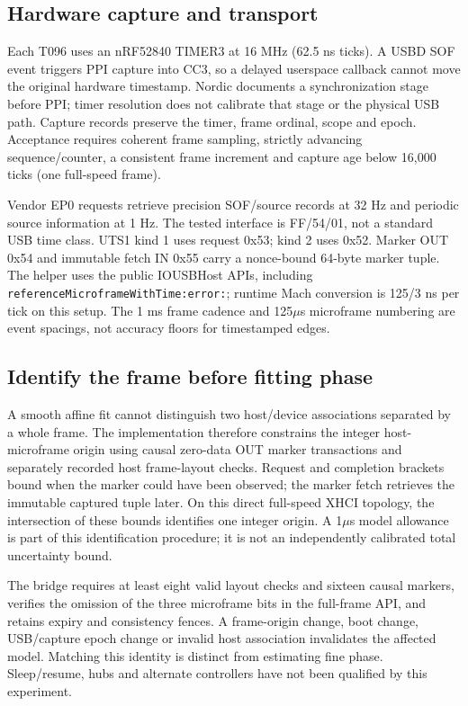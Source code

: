 \documentclass[11pt,letterpaper]{article}
\newcommand{\code}[1]{\texttt{#1}}\newcolumntype{L}[1]{>{\RaggedRight\arraybackslash}p{#1}}
\begin{document}
\subsection{Hardware capture and transport}
Each T096 uses an nRF52840 TIMER3 at 16 MHz (62.5 ns ticks). A USBD SOF event triggers PPI capture into CC3, so a delayed userspace callback cannot move the original hardware timestamp. Nordic documents a synchronization stage before PPI; timer resolution does not calibrate that stage or the physical USB path\cite{nordic}. Capture records preserve the timer, frame ordinal, scope and epoch. Acceptance requires coherent frame sampling, strictly advancing sequence/counter, a consistent frame increment and capture age below 16,000 ticks (one full-speed frame).

Vendor EP0 requests retrieve precision SOF/source records at 32 Hz and periodic source information at 1 Hz. The tested interface is FF/54/01, not a standard USB time class. UTS1 kind 1 uses request 0x53; kind 2 uses 0x52. Marker OUT 0x54 and immutable fetch IN 0x55 carry a nonce-bound 64-byte marker tuple. The helper uses the public IOUSBHost APIs, including \code{referenceMicroframeWithTime:error:}; runtime Mach conversion is 125/3 ns per tick on this setup\cite{appleusb,appleframe}. The 1 ms frame cadence and 125$\mu$s microframe numbering are event spacings, not accuracy floors for timestamped edges.

\subsection{Identify the frame before fitting phase}
A smooth affine fit cannot distinguish two host/device associations separated by a whole frame. The implementation therefore constrains the integer host-microframe origin using causal zero-data OUT marker transactions and separately recorded host frame-layout checks. Request and completion brackets bound when the marker could have been observed; the marker fetch retrieves the immutable captured tuple later. On this direct full-speed XHCI topology, the intersection of these bounds identifies one integer origin. A 1$\mu$s model allowance is part of this identification procedure; it is not an independently calibrated total uncertainty bound.

The bridge requires at least eight valid layout checks and sixteen causal markers, verifies the omission of the three microframe bits in the full-frame API, and retains expiry and consistency fences. A frame-origin change, boot change, USB/capture epoch change or invalid host association invalidates the affected model. Matching this identity is distinct from estimating fine phase. Sleep/resume, hubs and alternate controllers have not been qualified by this experiment.
\end{document}
